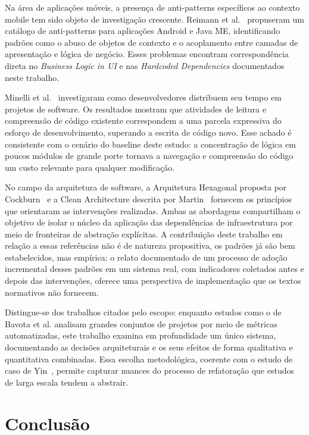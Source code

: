 \documentclass[sigconf,anonymous]{acmart}
\begin{document}
Na área de aplicações móveis, a presença de anti-patterns específicos ao contexto mobile tem sido objeto de investigação crescente. Reimann et al.~\cite{Reimann2014} propuseram um catálogo de anti-patterns para aplicações Android e Java ME, identificando padrões como o abuso de objetos de contexto e o acoplamento entre camadas de apresentação e lógica de negócio. Esses problemas encontram correspondência direta no \textit{Business Logic in UI} e nas \textit{Hardcoded Dependencies} documentados neste trabalho.

Minelli et al.~\cite{Minelli2013} investigaram como desenvolvedores distribuem seu tempo em projetos de software. Os resultados mostram que atividades de leitura e compreensão de código existente correspondem a uma parcela expressiva do esforço de desenvolvimento, superando a escrita de código novo. Esse achado é consistente com o cenário do baseline deste estudo: a concentração de lógica em poucos módulos de grande porte tornava a navegação e compreensão do código um custo relevante para qualquer modificação.

No campo da arquitetura de software, a Arquitetura Hexagonal proposta por Cockburn~\cite{Cockburn2005} e a Clean Architecture descrita por Martin~\cite{Martin2017} fornecem os princípios que orientaram as intervenções realizadas. Ambas as abordagens compartilham o objetivo de isolar o núcleo da aplicação das dependências de infraestrutura por meio de fronteiras de abstração explícitas. A contribuição deste trabalho em relação a essas referências não é de natureza propositiva, os padrões já são bem estabelecidos, mas empírica: o relato documentado de um processo de adoção incremental desses padrões em um sistema real, com indicadores coletados antes e depois das intervenções, oferece uma perspectiva de implementação que os textos normativos não fornecem.

Distingue-se dos trabalhos citados pelo escopo: enquanto estudos como o de Bavota et al. analisam grandes conjuntos de projetos por meio de métricas automatizadas, este trabalho examina em profundidade um único sistema, documentando as decisões arquiteturais e os seus efeitos de forma qualitativa e quantitativa combinadas. Essa escolha metodológica, coerente com o estudo de caso de Yin~\cite{Yin2014}, permite capturar nuances do processo de refatoração que estudos de larga escala tendem a abstrair.

\section{Conclusão}
\end{document}
